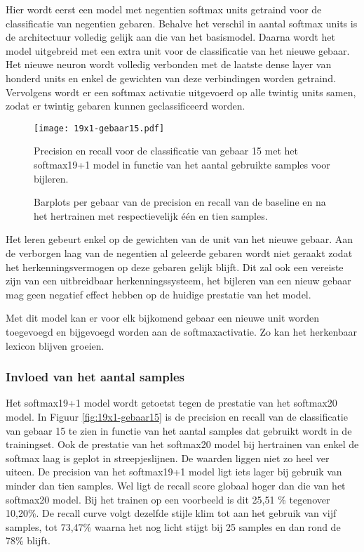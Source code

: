 \npar Hier wordt eerst een model met negentien softmax units getraind voor de classificatie van negentien gebaren. Behalve het verschil in aantal softmax units is de architectuur volledig gelijk aan die van het basismodel. Daarna wordt het model uitgebreid met een extra unit voor de classificatie van het nieuwe gebaar. Het nieuwe neuron wordt volledig verbonden met de laatste dense layer van honderd units en enkel de gewichten van deze verbindingen worden getraind. Vervolgens wordt er een softmax activatie uitgevoerd op alle twintig units samen, zodat er twintig gebaren kunnen geclassificeerd worden.

\begin{figure}
	\centering
	\texttt{[image: 19x1-gebaar15.pdf]}
	\caption{Precision en recall voor de classificatie van gebaar 15 met het softmax19+1 model in functie van het aantal gebruikte samples voor bijleren.}\label{fig:19x1-gebaar15}
	
		\vspace{0.5cm}
		\def\svgwidth{1.1\columnwidth}
		
		\caption{Barplots per gebaar van de precision en recall van de baseline en na het hertrainen met respectievelijk \'e\'en en tien samples. }\label{fig:19x1-all}
\end{figure}

\npar Het leren gebeurt enkel op de gewichten van de unit van het nieuwe gebaar. Aan de verborgen laag van de negentien al geleerde gebaren wordt niet geraakt zodat het herkenningsvermogen op deze gebaren gelijk blijft. Dit zal ook een vereiste zijn van een uitbreidbaar herkenningssysteem, het bijleren van een nieuw gebaar mag geen negatief effect hebben op de huidige prestatie van het model.

\npar Met dit model kan er voor elk bijkomend gebaar een nieuwe unit worden toegevoegd en bijgevoegd worden aan de softmaxactivatie. Zo kan het herkenbaar lexicon  blijven groeien.

\subsubsection{Invloed van het aantal samples}

Het softmax19+1 model wordt getoetst tegen de prestatie van het softmax20 model. In Figuur \ref{fig:19x1-gebaar15} is de precision en recall van de classificatie van gebaar 15 te zien in functie van het aantal samples dat gebruikt wordt in de trainingset. Ook de prestatie van het softmax20 model bij hertrainen van enkel de softmax laag is geplot in streepjeslijnen. De waarden liggen niet zo heel ver uiteen. De precision van het softmax19+1 model ligt iets lager bij gebruik van minder dan tien samples. Wel ligt de recall score globaal hoger dan die van het softmax20 model. Bij het trainen op een voorbeeld is dit 25,51 \% tegenover 10,20\%. De recall curve volgt dezelfde stijle klim tot aan het gebruik van vijf samples, tot 73,47\% waarna het nog licht stijgt bij 25 samples en dan rond de 78\% blijft.

